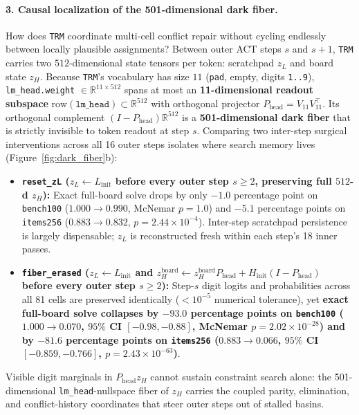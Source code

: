 \documentclass[10pt,letterpaper]{article}
\newcommand{\Phead}{P_{\mathrm{head}}}
\begin{document}
\paragraph{3. Causal localization of the 501-dimensional dark fiber.} How does \texttt{TRM} coordinate multi-cell conflict repair without cycling endlessly between locally plausible assignments? Between outer ACT steps $s$ and $s+1$, \texttt{TRM} carries two $512$-dimensional state tensors per token: scratchpad $z_L$ and board state $z_H$. Because \texttt{TRM}'s vocabulary has size $11$ (\texttt{pad}, empty, digits \texttt{1..9}), \texttt{lm\_head.weight} $\in \mathbb{R}^{11 \times 512}$ spans at most an \textbf{11-dimensional readout subspace} $\mathrm{row}(\texttt{lm\_head}) \subset \mathbb{R}^{512}$ with orthogonal projector $\Phead = V_{11} V_{11}^\top$. Its orthogonal complement $(I - \Phead)\mathbb{R}^{512}$ is a \textbf{501-dimensional dark fiber} that is strictly invisible to token readout at step $s$. Comparing two inter-step surgical interventions across all 16 outer steps isolates where search memory lives (Figure~\ref{fig:dark_fiber}b):
\begin{itemize}
  \item \textbf{\texttt{reset\_zL} ($z_L \leftarrow L_{\mathrm{init}}$ before every outer step $s\ge 2$, preserving full $512$-d $z_H$):} Exact full-board solve drops by only $\mathbf{-1.0}$ percentage point on \texttt{bench100} ($1.000 \to 0.990$, McNemar $p=1.0$) and $\mathbf{-5.1}$ percentage points on \texttt{items256} ($0.883 \to 0.832$, $p=2.44\times 10^{-4}$). Inter-step scratchpad persistence is largely dispensable; $z_L$ is reconstructed fresh within each step's 18 inner passes.
  \item \textbf{\texttt{fiber\_erased} ($z_L \leftarrow L_{\mathrm{init}}$ and $z_H^{\mathrm{board}} \leftarrow z_H^{\mathrm{board}}\Phead + H_{\mathrm{init}}(I-\Phead)$ before every outer step $s\ge 2$):} Step-$s$ digit logits and probabilities across all 81 cells are preserved identically ($< 10^{-5}$ numerical tolerance), yet \textbf{exact full-board solve collapses by $-93.0$ percentage points on \texttt{bench100} ($1.000 \to 0.070$, $95\%$ CI $[-0.98, -0.88]$, McNemar $p = 2.02\times 10^{-28}$) and by $-81.6$ percentage points on \texttt{items256} ($0.883 \to 0.066$, $95\%$ CI $[-0.859, -0.766]$, $p = 2.43\times 10^{-63}$)}.
\end{itemize}

Visible digit marginals in $\Phead z_H$ cannot sustain constraint search alone: the 501-dimensional \texttt{lm\_head}-nullspace fiber of $z_H$ carries the coupled parity, elimination, and conflict-history coordinates that steer outer steps out of stalled basins.
\end{document}

